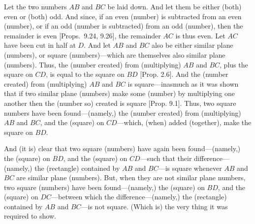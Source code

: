 \begin{Parallel}{}{}
{Let the two numbers $AB$ and $BC$ be laid down. And let them
be either (both)  even or (both) odd. And since, if an even (number) is subtracted
from an even (number), or if an odd (number is subtracted) from an odd
(number), then the remainder is even [Props.~9.24, 9.26], the remainder $AC$ is thus even. Let
$AC$ have been cut in half at $D$. And let $AB$ and $BC$ also be
either similar plane (numbers), or square (numbers)---which are themselves
also similar plane (numbers). Thus, the (number created) from (multiplying)  $AB$ and
$BC$, plus the square on $CD$, is equal to the square on $BD$ [Prop. 2.6].  And the (number created) from (multiplying) $AB$ and $BC$ is square---inasmuch as it was shown that
if two similar plane (numbers) make some (number) by multiplying
one another then the (number so) created is square [Prop. 9.1]. Thus, two square numbers have been
found---(namely,) the (number created) from (multiplying) $AB$ and $BC$,
and the (square) on $CD$---which, (when) added (together),
make the square on $BD$.

And (it is) clear that two square (numbers) have again been found---(namely,) the (square) on $BD$, and the (square) on $CD$---such that their difference---(namely,) the (rectangle) contained by $AB$ and $BC$---is  square
whenever $AB$ and $BC$ are similar plane (numbers). But, when they are
not similar plane numbers, two square (numbers) have been found---(namely,) the (square) on $BD$, and the (square) on $DC$---between which the difference---(namely,) the (rectangle) contained by $AB$ and $BC$---is
not  square. (Which is) the very thing it was required to show.}
\end{Parallel}

